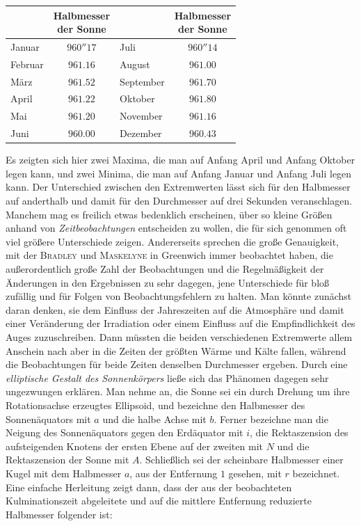 \begin{center}\begin{tabular}{l|c||l|c}
&\shortstack{Halbmesser\\der Sonne}&&\shortstack{Halbmesser\\der Sonne}\\ \hline
Januar & $960''17$ & Juli & $960''14$ \\
Februar & $961.16$ & August & $961.00$ \\
März & $961.52$ & September & $961.70$ \\
April & $961.22$ & Oktober & $961.80$ \\
Mai & $961.20$ & November & $961.16$ \\
Juni & $960.00$ & Dezember & $960.43$ \\
\end{tabular}\end{center}

Es zeigten sich hier zwei Maxima, die man auf Anfang April und Anfang Oktober legen kann, und zwei Minima, die man auf Anfang Januar und Anfang Juli legen kann. Der Unterschied zwischen den Extremwerten lässt sich für den Halbmesser auf anderthalb und damit für den Durchmesser auf drei Sekunden veranschlagen. Manchem mag es freilich etwas bedenklich erscheinen, über so kleine Größen anhand von \emph{Zeitbeobachtungen} entscheiden zu wollen, die für sich genommen oft viel größere Unterschiede zeigen. Andererseits sprechen die große Genauigkeit, mit der \textsc{Bradley} und \textsc{Maskelyne} in Greenwich immer beobachtet haben, die außerordentlich große Zahl der Beobachtungen und die Regelmäßigkeit der Änderungen in den Ergebnissen zu sehr dagegen, jene Unterschiede für bloß zufällig und für Folgen von Beobachtungsfehlern zu halten. Man könnte zunächst daran denken, sie dem Einfluss der Jahreszeiten auf die Atmosphäre und damit einer Veränderung der Irradiation oder einem Einfluss auf die Empfindlichkeit des Auges zuzuschreiben. Dann müssten die beiden verschiedenen Extremwerte allem Anschein nach aber in die Zeiten der größten Wärme und Kälte fallen, während die Beobachtungen für beide Zeiten denselben Durchmesser ergeben. Durch eine \emph{elliptische Gestalt des Sonnenkörpers} ließe sich das Phänomen dagegen sehr ungezwungen erklären. Man nehme an, die Sonne sei ein durch Drehung um ihre Rotationsachse erzeugtes Ellipsoid, und bezeichne den Halbmesser des Sonnenäquators mit $a$ und die halbe Achse mit $b$. Ferner bezeichne man die Neigung des Sonnenäquators gegen den Erdäquator mit $i$, die Rektaszension des aufsteigenden Knotens der ersten Ebene auf der zweiten mit $N$ und die Rektaszension der Sonne mit $A$. Schließlich sei der scheinbare Halbmesser einer Kugel mit dem Halbmesser $a$, aus der Entfernung $1$ gesehen, mit $r$ bezeichnet. Eine einfache Herleitung zeigt dann, dass der aus der beobachteten Kulminationszeit abgeleitete und auf die mittlere Entfernung reduzierte Halbmesser folgender ist:


